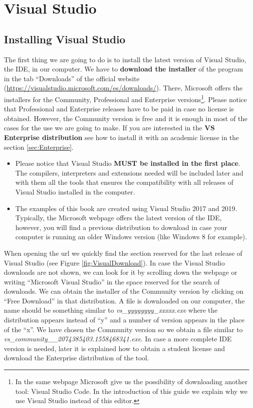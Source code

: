 \chapter{Visual Studio} \label{ch:VS}

    \FloatBarrier
    \section{Installing Visual Studio}

The first thing we are going to do is to install the latest version of Visual Studio, the IDE, in our computer. We have to \textbf{download the installer} of the program in the tab ``Downloads'' of the official website (\url{https://visualstudio.microsoft.com/es/downloads/}). There, Microsoft offers the installers for the Community, Professional and Enterprise versions\footnote{In the same webpage Microsoft give us the possibility of downloading another tool: Visual Studio Code. In the introduction of this guide we explain why we use Visual Studio instead of this editor.}. Please notice that Professional and Enterprise releases have to be paid in case no license is obtained. However, the Community version is free and it is enough in most of the cases for the use we are going to make. If you are interested in the \textbf{VS Enterprise distribution} see how to install it with an academic license in the section \ref{sec:Enterprise}.

\begin{IN}
    \begin{itemize}
        \item Please notice that Visual Studio \textbf{MUST be installed in the first place}. The compilers, interpreters and extensions needed will be included later and with them all the tools that ensures the compatibility with all releases of Visual Studio installed in the computer.
        \item The examples of this book are created using Visual Studio 2017 and 2019. Typically, the Microsoft webpage offers the latest version of the IDE, however, you will find a previous distribution to download in case your computer is running an older Windows version (like Windows 8 for example).
    \end{itemize}
\end{IN}

When opening the url we quickly find the section reserved for the last release of Visual Studio (see Figure \ref{fig:VisualDownload}). In case the Visual Studio downloads are not shown, we can look for it by scrolling down the webpage or writing ``Microsoft Visual Studio'' in the space reserved for the search of downloads. We can obtain the installer of the Community version by clicking on ``Free Download'' in that distribution.  A file is downloaded on our computer, the name should be something similar to \textit{vs\_yyyyyyyy\_xxxxx.exe} where the distribution appears instead of ``y'' and a number of version appears in the place of the ``x''. We have chosen the Community version so we obtain a file similar to \textit{vs\_community\_\_2074385403.1558468341.exe}. In case a more complete IDE version is needed, later it is explained how to obtain a student license and download the Enterprise distribution of the tool.

